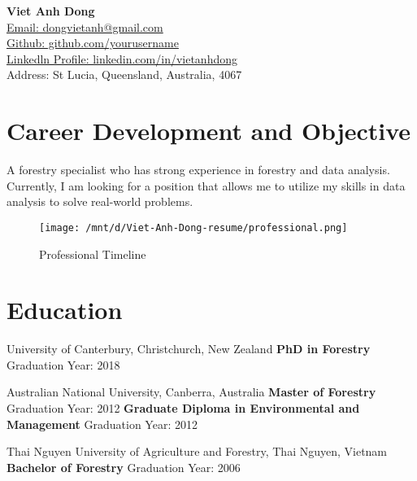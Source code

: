 \documentclass[a4paper,12pt]{article}
\begin{document}
\begin{center}
    {\LARGE \textbf{Viet Anh Dong}} \\
    \vspace{1mm}
    \href{mailto:dongvietanh@gmail.com}{Email: dongvietanh@gmail.com} \\
    \href{https://github.com/yourusername}{Github: github.com/yourusername} \\
    \href{https://www.linkedin.com/in/vietanhdong}{Linkedln Profile: linkedin.com/in/vietanhdong}\\
    Address: St Lucia, Queensland, Australia, 4067 \\
\end{center}

\section*{Career Development and Objective}
A forestry specialist who has strong experience in forestry and data analysis. \newline
Currently, I am looking for a position that allows me to utilize my skills in data analysis to solve real-world problems.

\begin{figure}[ht]
    \centering
    \texttt{[image: /mnt/d/Viet-Anh-Dong-resume/professional.png]}
    \caption{Professional Timeline}
    \label{fig:your_image}
\end{figure}

\section*{Education}
University of Canterbury, Christchurch, New Zealand \newline
\textbf{PhD in Forestry} \hfill Graduation Year: 2018 \newline

\par %
\noindent
Australian National University, Canberra, Australia \newline
\textbf{Master of Forestry} \hfill Graduation Year: 2012 \newline
\textbf{Graduate Diploma in Environmental and Management} \hfill Graduation Year: 2012 \newline

\par %
\noindent
Thai Nguyen University of Agriculture and Forestry, Thai Nguyen, Vietnam \newline
\textbf{Bachelor of Forestry} \hfill Graduation Year: 2006
\end{document}
